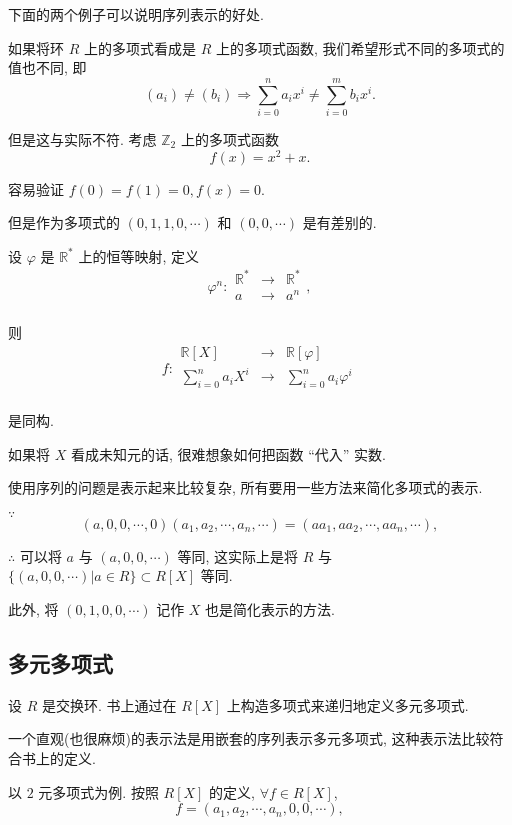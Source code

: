 \documentclass[color=black,device=normal,lang=cn,mode=geye]{elegantnote}
\begin{document}
下面的两个例子可以说明序列表示的好处.
\begin{example}
    如果将环 $R$ 上的多项式看成是 $R$ 上的多项式函数, 我们希望形式不同的多项式的值也不同, 即
    \[(a_i)\neq(b_i)\Rightarrow\sum\limits_{i=0}^{n}a_ix^i\neq\sum\limits_{i=0}^{m}b_ix^i.\]

    但是这与实际不符. 考虑 $\mathbb{Z}_2$ 上的多项式函数
    \[f(x)=x^2+x.\]

    容易验证 $f(0)=f(1)=0,f(x)=0$.

    但是作为多项式的 $(0,1,1,0,\cdots)$ 和 $(0,0,\cdots)$ 是有差别的.
\end{example}
\begin{example}
    设 $\varphi$ 是 $\mathbb{R}^*$ 上的恒等映射, 定义
    \[\varphi^n:\begin{array}{rcl}
        \mathbb{R}^* & \to & \mathbb{R}^* \\
        a & \to & a^n \\
    \end{array},\]

    则
    \[f:\begin{array}{rcl}
        \mathbb{R}[X] & \to & \mathbb{R}[\varphi] \\
        \sum\limits_{i=0}^{n}a_iX^i & \to & \sum\limits_{i=0}^{n}a_i\varphi^i \\
    \end{array}\]

    是同构.

    如果将 $X$ 看成未知元的话, 很难想象如何把函数 ``代入'' 实数.
\end{example}
使用序列的问题是表示起来比较复杂, 所有要用一些方法来简化多项式的表示.
\begin{example}
    $\because$
    \[(a,0,0,\cdots,0)(a_1,a_2,\cdots,a_n,\cdots)=(aa_1,aa_2,\cdots,aa_n,\cdots),\]

    $\therefore$ 可以将 $a$ 与 $(a,0,0,\cdots)$ 等同, 这实际上是将 $R$ 与 $\{(a,0,0,\cdots)|a\in R\}\subset R[X]$ 等同.
\end{example}
此外, 将 $(0,1,0,0,\cdots)$ 记作 $X$ 也是简化表示的方法.
\subsection{多元多项式}
设 $R$ 是交换环. 书上通过在 $R[X]$ 上构造多项式来递归地定义多元多项式.

一个直观(也很麻烦)的表示法是用嵌套的序列表示多元多项式, 这种表示法比较符合书上的定义.

以 $2$ 元多项式为例. 按照 $R[X]$ 的定义, $\forall f\in R[X]$,
\[f=(a_1,a_2,\cdots,a_n,0,0,\cdots),\]
\end{document}

